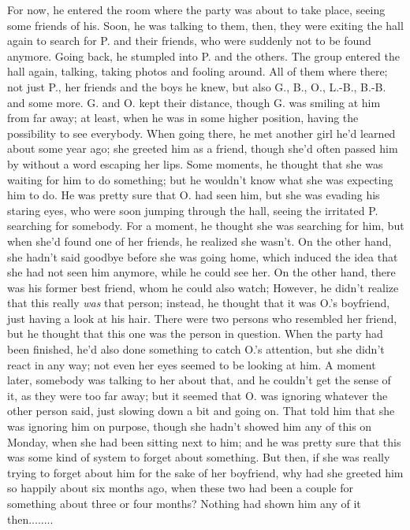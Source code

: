 For now, he entered the room where the party was about to take place, seeing some friends of his. Soon, he was talking to them, then, they were exiting the hall again to search for P. and their friends, who were suddenly not to be found anymore. Going back, he stumpled into P. and the others. The group entered the hall again, talking, taking photos and fooling around. 
All of them where there; not just P., her friends and the boys he knew, but also G., B., O., L.-B., B.-B. and some more. 
G. and O. kept their distance, though G. was smiling at him from far away; at least, when he was in some higher position, having the possibility to see everybody. When going there, he met another girl he'd learned about some year ago; she greeted him as a friend, though she'd often passed him by without a word escaping her lips. Some moments, he thought that she was waiting for him to do something; but he wouldn't know what she was expecting him to do. He was pretty sure that O. had seen him, but she was evading his staring eyes, who were soon jumping through the hall, seeing the irritated P. searching for somebody. For a moment, he thought she was searching for him, but when she'd found one of her friends, he realized she wasn't. On the other hand, she hadn't said goodbye before she was going home, which induced the idea that she had not seen him anymore, while he could see her. 
On the other hand, there was his former best friend, whom he could also watch; However, he didn't realize that this really \emph{was} that person; instead, he thought that it was O.'s boyfriend, just having a look at his hair. There were two persons who resembled her friend, but he thought that this one was the person in question. When the party had been finished, he'd also done something to catch O.'s attention, but she didn't react in any way; not even her eyes seemed to be looking at him. A moment later, somebody was talking to her about that, and he couldn't get the sense of it, as they were too far away; but it seemed that O. was ignoring whatever the other person said, just slowing down a bit and going on. 
That told him that she was ignoring him on purpose, though she hadn't showed him any of this on Monday, when she had been sitting next to him; and he was pretty sure that this was some kind of system to forget about something. 
But then, if she was really trying to forget about him for the sake of her boyfriend, why had she greeted him so happily about six months ago, when these two had been a couple for something about three or four months? Nothing had shown him any of it then........
